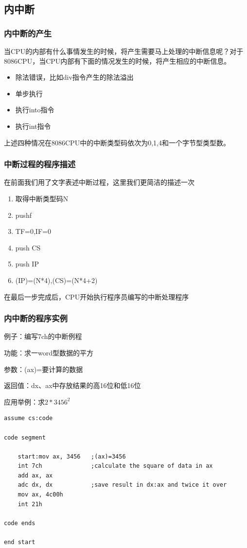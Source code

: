 \documentclass[UTF8]{ctexart}
\begin{document}
\subsection{内中断}
\subsubsection{内中断的产生}
当CPU的内部有什么事情发生的时候，将产生需要马上处理的中断信息呢？对于8086CPU，当CPU内部有下面的情况发生的时候，将产生相应的中断信息。
\begin{itemize}
  \item 除法错误，比如div指令产生的除法溢出
  \item 单步执行
  \item 执行into指令
  \item 执行int指令
\end{itemize}
上述四种情况在8086CPU中的中断类型码依次为0,1,4和一个字节型类型数。
\subsubsection{中断过程的程序描述}
在前面我们用了文字表述中断过程，这里我们更简洁的描述一次
\begin{enumerate}[(1)]
  \item 取得中断类型码N
  \item pushf
  \item TF=0,IF=0
  \item push CS
  \item push IP
  \item (IP)=(N*4),(CS)=(N*4+2)
\end{enumerate}
在最后一步完成后，CPU开始执行程序员编写的中断处理程序
\subsubsection{内中断的程序实例}
例子：编写7ch的中断例程\par
功能：求一word型数据的平方\par
参数：(ax)=要计算的数据\par
返回值：dx、ax中存放结果的高16位和低16位\par
应用举例：求$2*3456^{2}$
\begin{lstlisting}
assume cs:code

code segment
    
    start:mov ax, 3456   ;(ax)=3456
    int 7ch              ;calculate the square of data in ax
    add ax, ax
    adc dx, dx           ;save result in dx:ax and twice it over
    mov ax, 4c00h
    int 21h
    
code ends    

end start    
\end{lstlisting}
\end{document}
